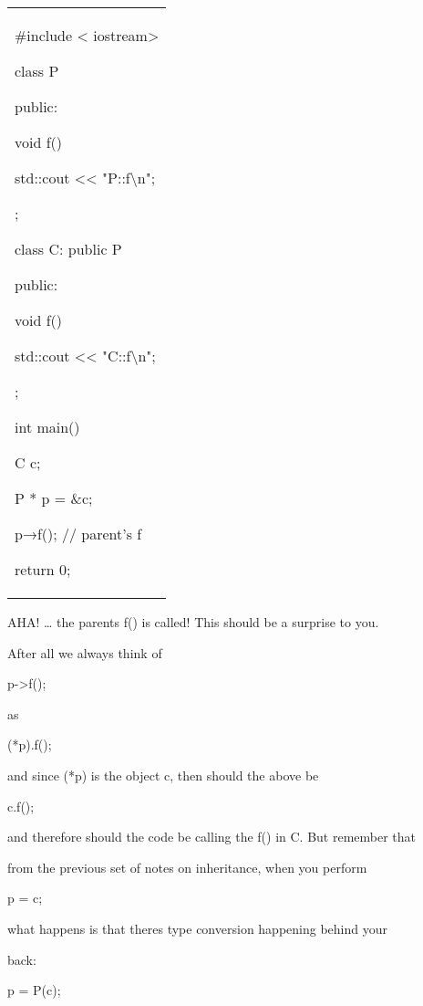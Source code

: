\begin{longtable}[]{@{}
  >{\raggedright\arraybackslash}p{}@{}}
\toprule\noalign{}
 \\
\midrule\noalign{}
\endhead
\bottomrule\noalign{}
\endlastfoot
\#include < iostream\textgreater{}

class P

{

public:

void f()

{

std::cout <<{} "P::f\textbackslash n";

}

};

class C: public P

{

public:

void f()

{

std::cout <<{} "C::f\textbackslash n";

}

};

int main()

{

C c;

P * p = \&c;

p→f(); // parent's f

return 0;

} \\
\end{longtable}

AHA! \ldots{} the parent\textquotesingle s f() is called! This should be
a surprise to you.

After all we always think of

p-\textgreater f();

as

(*p).f();

and since (*p) is the object c, then should the above be

c.f();

and therefore should the code be calling the f() in C. But remember that

from the previous set of notes on inheritance, when you perform

p = c;

what happens is that there\textquotesingle s type conversion happening
behind your

back:

p = P(c);

